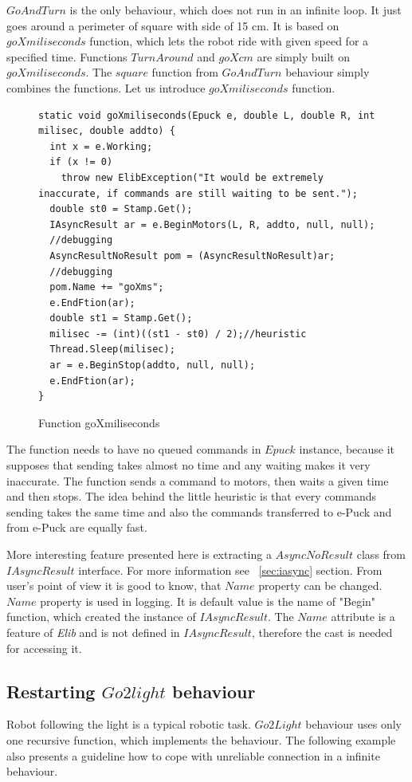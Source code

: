   $GoAndTurn$ is the only behaviour, which does not run in an infinite loop. 
  It just goes around a perimeter of square with side
  of 15 cm. It is based on $goXmiliseconds$ function, which lets the robot ride with given speed for a specified time.
  Functions $TurnAround$ and $goXcm$ are simply built on $goXmiliseconds$. The $square$ function from $GoAndTurn$ behaviour
  simply combines the functions.
  Let us introduce $goXmiliseconds$ function.
\begin{figure}[!hbp]
\begin{lstlisting}
static void goXmiliseconds(Epuck e, double L, double R, int milisec, double addto) {
  int x = e.Working;
  if (x != 0)
    throw new ElibException("It would be extremely inaccurate, if commands are still waiting to be sent.");
  double st0 = Stamp.Get();
  IAsyncResult ar = e.BeginMotors(L, R, addto, null, null);
  //debugging
  AsyncResultNoResult pom = (AsyncResultNoResult)ar;
  //debugging
  pom.Name += "goXms";
  e.EndFtion(ar);
  double st1 = Stamp.Get();
  milisec -= (int)((st1 - st0) / 2);//heuristic
  Thread.Sleep(milisec);
  ar = e.BeginStop(addto, null, null);
  e.EndFtion(ar);
}
\end{lstlisting}
\caption{Function goXmiliseconds} \label{gox}
\end{figure}

  The function needs to have no queued commands in $Epuck$ instance, 
  because it supposes that sending takes almost no time and any waiting makes it very inaccurate.
  The function sends a command to motors, then waits a given time and then stops.
  The idea behind the little heuristic is that every commands sending takes the 
  same time and also the commands transferred to e-Puck and from e-Puck are equally fast.

  More interesting feature presented here is extracting a $AsyncNoResult$ class from $IAsyncResult$ interface. 
  For more information see ~\ref{sec:iasync} section.
  From user's point of view it is good to know, that $Name$ property can be changed. $Name$ property is used in logging. 
  It is default value is the name of "Begin" function,
  which created the instance of $IAsyncResult$. The $Name$ attribute is a feature of {\it Elib} 
  and is not defined in $IAsyncResult$, therefore the cast is needed for accessing it.

\subsection{Restarting $Go2light$ behaviour}\label{sec:go2light}
  Robot following the light is a typical robotic task. $Go2Light$ behaviour uses only one recursive function, which implements the behaviour.
  The following example also presents a guideline how to cope with unreliable connection in a infinite behaviour.

